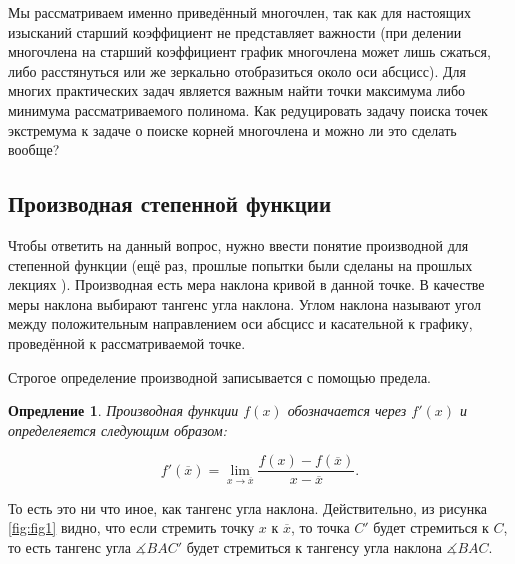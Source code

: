 \documentclass[12pt]{article}
\newtheorem{definition}{Опредление}[section]
\begin{document}
Мы рассматриваем именно приведённый многочлен, так как для настоящих изысканий старший коэффициент не представляет важности (при делении многочлена на старший коэффициент график многочлена может лишь сжаться, либо расстянуться или же зеркально отобразиться около оси абсцисс). Для многих практических задач является важным найти точки максимума либо минимума рассматриваемого полинома. Как редуцировать задачу поиска точек экстремума к задаче о поиске корней многочлена и можно ли это сделать вообще?

\subsection{Производная степенной функции}
\par Чтобы ответить на данный вопрос, нужно ввести понятие производной для степенной функции (ещё раз, прошлые попытки были сделаны на прошлых лекциях \cite{lim_use}). Производная есть мера наклона кривой в данной точке. В качестве меры наклона выбирают тангенс угла наклона. Углом наклона называют угол между положительным направлением оси абсцисс и касательной к графику, проведённой к рассматриваемой точке.

\par Строгое определение производной записывается с помощью предела. 

\begin{definition}\label{def:1}
	Производная функции $f(x)$ обозначается через $f'(x)$ и определеяется следующим образом:
	
	\begin{equation}
		f'(\overline{x}) = \lim_{x\rightarrow\overline{x}}\dfrac{f(x) - f(\overline{x})}{x - \overline{x}}.
	\end{equation}
\end{definition}

\par То есть это ни что иное, как тангенс угла наклона. Действительно, из рисунка \ref{fig:fig1} видно, что если стремить точку $x$ к $\overline{x}$, то точка $C'$ будет стремиться к $C$, то есть тангенс угла $\measuredangle BAC'$ будет стремиться к тангенсу угла наклона $\measuredangle BAC$.
\end{document}
